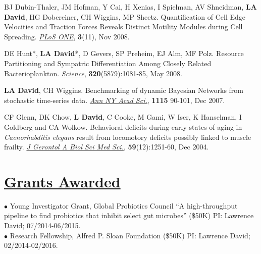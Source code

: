 \documentclass[overlapped,line,11pt]{res}
\begin{document}
\begin{resume}
\begin{revnumerate}[11]
\vspace*{1mm}
\item { BJ Dubin-Thaler, JM Hofman, Y Cai, H Xenias, I Spielman, AV
  Shneidman, \textbf{LA David}, HG Dobereiner, CH Wiggins, MP Sheetz.
  Quantification of Cell Edge Velocities and Traction Forces Reveals
  Distinct Motility Modules during Cell Spreading. \emph{\underline{PLoS ONE}},
  \textbf{3}(11), Nov 2008.}

\vspace*{1mm}
\item {DE Hunt*, \textbf{LA David}*, D Gevers, SP Preheim, EJ Alm, MF
Polz.  Resource Partitioning and Sympatric Differentiation Among
Closely Related Bacterioplankton.  \emph{\underline{Science}},
\textbf{320}(5879):1081-85, May 2008.}

\vspace*{1mm}
\item {\textbf{LA David}, CH Wiggins. Benchmarking of dynamic Bayesian
  Networks from stochastic time-series data. \emph{\underline{Ann NY Acad Sci.}},
  \textbf{1115} 90-101, Dec 2007.}

\vspace*{1mm}
\item {CF Glenn, DK Chow, \textbf{L David}, C Cooke, M Gami, W Iser, K
  Hanselman, I Goldberg and CA Wolkow. Behavioral deficits during
  early states of aging in {\em Caenorhabditis elegans} result from
  locomotory deficits possibly linked to muscle frailty. \emph{\underline{J
    Gerontol A Biol Sci Med Sci.}}, \textbf{59}(12):1251-60, Dec 2004.}
\end{revnumerate}

\section{\underline{\sc Grants Awarded}} 
\vspace{.05in}

\hangindent=0.5in $\bullet$\hspace{.1in} Young Investigator Grant,
Global Probiotics Council ``A high-throughput pipeline to find
probiotics that inhibit select gut microbes'' (\$50K) PI:
Lawrence David; 07/2014-06/2015. \\

\vspace{-10mm}
\hangindent=0.5in $\bullet$\hspace{.1in} Research Fellowship, Alfred
P. Sloan Foundation (\$50K) PI:
Lawrence David; 02/2014-02/2016. \\


\end{resume}
\end{document}
